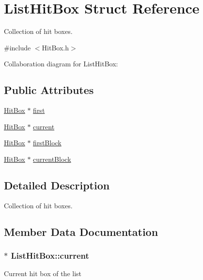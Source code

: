 \hypertarget{structListHitBox}{}\section{List\+Hit\+Box Struct Reference}
\label{structListHitBox}


Collection of hit boxes.  




{\ttfamily \#include $<$Hit\+Box.\+h$>$}



Collaboration diagram for List\+Hit\+Box\+:
\subsection*{Public Attributes}
\begin{DoxyCompactItemize}
\item 
\hyperlink{structHitBox}{Hit\+Box} $\ast$ \hyperlink{structListHitBox_ad74444cd226717237814eaeac80a875f}{first}
\item 
\hyperlink{structHitBox}{Hit\+Box} $\ast$ \hyperlink{structListHitBox_aca919adfe212d5525a9b24d9bd7d2a93}{current}
\item 
\hyperlink{structHitBox}{Hit\+Box} $\ast$ \hyperlink{structListHitBox_a2086de15780fff764e013223601b8455}{first\+Block}
\item 
\hyperlink{structHitBox}{Hit\+Box} $\ast$ \hyperlink{structListHitBox_a5ecee29db2078182f88247b05cf13636}{current\+Block}
\end{DoxyCompactItemize}


\subsection{Detailed Description}
Collection of hit boxes. 

\subsection{Member Data Documentation}
\subsubsection[{\texorpdfstring{current}{current}}]{$\ast$ List\+Hit\+Box\+::current}\hypertarget{structListHitBox_aca919adfe212d5525a9b24d9bd7d2a93}{}\label{structListHitBox_aca919adfe212d5525a9b24d9bd7d2a93}
Current hit box of the list 
